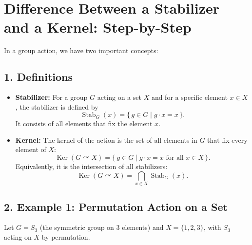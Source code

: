 \documentclass[12pt]{article}
\title{}
\author{Jerich Lee}
\date{\today}
\theoremstyle{definition} %
\theoremstyle{plain} %
\begin{document}
\maketitle

\section*{Difference Between a Stabilizer and a Kernel: Step-by-Step}

In a group action, we have two important concepts:

\subsection*{1. Definitions}
\begin{itemize}
    \item \textbf{Stabilizer:} For a group \(G\) acting on a set \(X\) and for a specific element \(x\in X\), the stabilizer is defined by
    \[
    \operatorname{Stab}_G(x) = \{\,g\in G \mid g\cdot x = x\,\}.
    \]
    It consists of all elements that fix the element \(x\).

    \item \textbf{Kernel:} The kernel of the action is the set of all elements in \(G\) that fix every element of \(X\):
    \[
    \operatorname{Ker}(G\curvearrowright X) = \{\,g\in G \mid g\cdot x = x \text{ for all } x\in X\,\}.
    \]
    Equivalently, it is the intersection of all stabilizers:
    \[
    \operatorname{Ker}(G\curvearrowright X) = \bigcap_{x\in X} \operatorname{Stab}_G(x).
    \]
\end{itemize}

\subsection*{2. Example 1: Permutation Action on a Set}
Let \(G = S_3\) (the symmetric group on 3 elements) and \(X = \{1,2,3\}\), with \(S_3\) acting on \(X\) by permutation.
\end{document}
